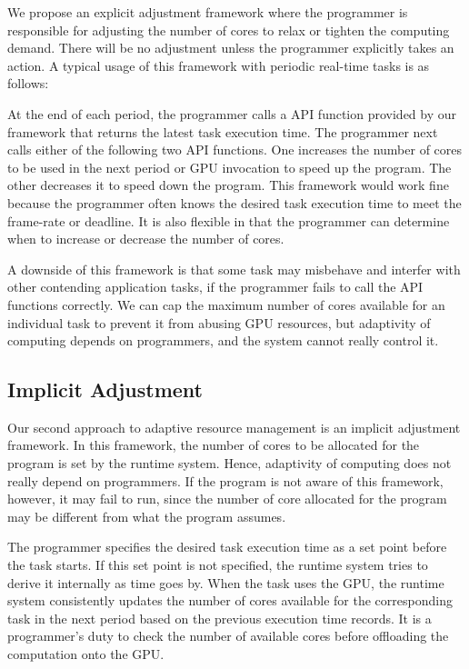 \documentclass[times, 10pt, twocolumn]{article}
\begin{document}
We propose an explicit adjustment framework where the programmer is
responsible for adjusting the number of cores to relax or tighten
the computing demand.
There will be no adjustment unless the programmer explicitly takes an
action.
A typical usage of this framework with periodic real-time tasks is as
follows:

At the end of each period, the programmer calls a API function provided
by our framework that returns the latest task execution time.
The programmer next calls either of the following two API functions.
One increases the number of cores to be used in the next period or GPU
invocation to speed up the program.
The other decreases it to speed down the program.
This framework would work fine because the programmer often knows the
desired task execution time to meet the frame-rate or deadline.
It is also flexible in that the programmer can determine when to
increase or decrease the number of cores.

A downside of this framework is that some task may misbehave
and interfer with other contending application tasks, if the programmer
fails to call the API functions correctly.
We can cap the maximum number of cores available for an individual task
to prevent it from abusing GPU resources, but adaptivity of computing
depends on programmers, and the system cannot really control it.

\subsection{Implicit Adjustment}

Our second approach to adaptive resource management is an implicit
adjustment framework.
In this framework, the number of cores to be allocated for the program
is set by the runtime system.
Hence, adaptivity of computing does not really depend on programmers.
If the program is not aware of this framework, however, it may fail to
run, since the number of core allocated for the program may be different
from what the program assumes.

The programmer specifies the desired task execution time as a set point
before the task starts.
If this set point is not specified, the runtime system tries to derive
it internally as time goes by.
When the task uses the GPU, the runtime system consistently updates the
number of cores available for the corresponding task in the next period
based on the previous execution time records.
It is a programmer's duty to check the number of available cores before
offloading the computation onto the GPU.
\end{document}
